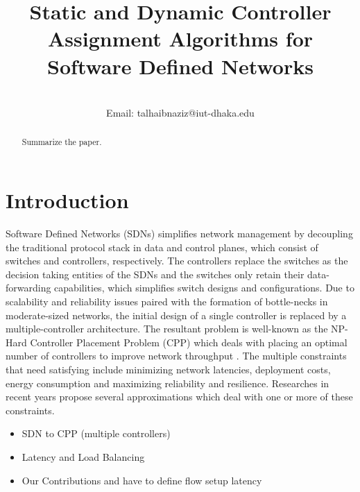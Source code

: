 \documentclass{IEEEtran}
\title{Static and Dynamic Controller Assignment Algorithms for Software Defined Networks}
\author{\IEEEauthorblockN{Talha Ibn Aziz\IEEEauthorrefmark{1}}
	
	\IEEEauthorblockA{\IEEEauthorrefmark{1}Department of Computer Science and Engineering, Islamic University of Technology, Dhaka, Bangladesh} \\
	Email:  \IEEEauthorrefmark{1}talhaibnaziz@iut-dhaka.edu
}
\begin{document}
	
	\maketitle
	
	
	
	\begin{abstract}
		
		\noindent 
		Summarize the paper.
		
		\begin{IEEEkeywords}
			
		\end{IEEEkeywords}
		
	\end{abstract}
	
	
	
	\section{Introduction}
	Software Defined Networks (SDNs) simplifies network management by decoupling the traditional protocol stack in data and control planes, which consist of switches and controllers, respectively. The controllers replace the switches as the decision taking entities of the SDNs and the switches only retain their data-forwarding capabilities, which simplifies switch designs and configurations. Due to scalability and reliability issues \cite{scalability2013dixit, scalability2013yeganeh} paired with the formation of bottle-necks in moderate-sized networks, the initial design of a single controller \cite{greene2009tr10} is replaced by a multiple-controller architecture. The resultant problem is well-known as the NP-Hard Controller Placement Problem (CPP) which deals with placing an optimal number of controllers to improve network throughput \cite{cppsurvey2017, cppsurvey2018, sdnsurvey2017}. The multiple constraints that need satisfying include minimizing network latencies, deployment costs, energy consumption and maximizing reliability and resilience. Researches in recent years propose several approximations which deal with one or more of these constraints. 
	
	\begin{itemize}
		\item SDN to CPP (multiple controllers)
		\item Latency and Load Balancing
		\item Our Contributions and have to define flow setup latency
	\end{itemize}
\end{document}
